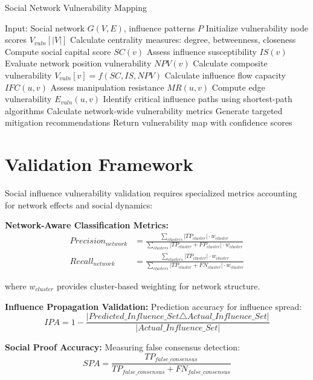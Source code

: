 \documentclass[11pt,a4paper]{article}
\begin{document}
\begin{algorithm}
\caption{Social Network Vulnerability Mapping}
\begin{algorithmic}[1]
\STATE Input: Social network $G(V,E)$, influence patterns $P$
\STATE Initialize vulnerability node scores $V_{vuln}[|V|]$
    \STATE Calculate centrality measures: degree, betweenness, closeness
    \STATE Compute social capital score $SC(v)$
    \STATE Assess influence susceptibility $IS(v)$
    \STATE Evaluate network position vulnerability $NPV(v)$
    \STATE Calculate composite vulnerability $V_{vuln}[v] = f(SC, IS, NPV)$
\ENDFOR
{}
    \STATE Calculate influence flow capacity $IFC(u,v)$
    \STATE Assess manipulation resistance $MR(u,v)$
    \STATE Compute edge vulnerability $E_{vuln}(u,v)$
\ENDFOR
\STATE Identify critical influence paths using shortest-path algorithms
\STATE Calculate network-wide vulnerability metrics
\STATE Generate targeted mitigation recommendations
\STATE Return vulnerability map with confidence scores
\end{algorithmic}
\end{algorithm}

\section{Validation Framework}

Social influence vulnerability validation requires specialized metrics accounting for network effects and social dynamics:

\textbf{Network-Aware Classification Metrics:}
\begin{align}
Precision_{network} &= \frac{\sum_{clusters} |TP_{cluster}| \cdot w_{cluster}}{\sum_{clusters} |TP_{cluster} + FP_{cluster}| \cdot w_{cluster}} \\
Recall_{network} &= \frac{\sum_{clusters} |TP_{cluster}| \cdot w_{cluster}}{\sum_{clusters} |TP_{cluster} + FN_{cluster}| \cdot w_{cluster}}
\end{align}

where $w_{cluster}$ provides cluster-based weighting for network structure.

\textbf{Influence Propagation Validation:}
Prediction accuracy for influence spread:
\begin{equation}
IPA = 1 - \frac{|Predicted\_Influence\_Set \triangle Actual\_Influence\_Set|}{|Actual\_Influence\_Set|}
\end{equation}

\textbf{Social Proof Accuracy:}
Measuring false consensus detection:
\begin{equation}
SPA = \frac{TP_{false\_consensus}}{TP_{false\_consensus} + FN_{false\_consensus}}
\end{equation}
\end{document}
